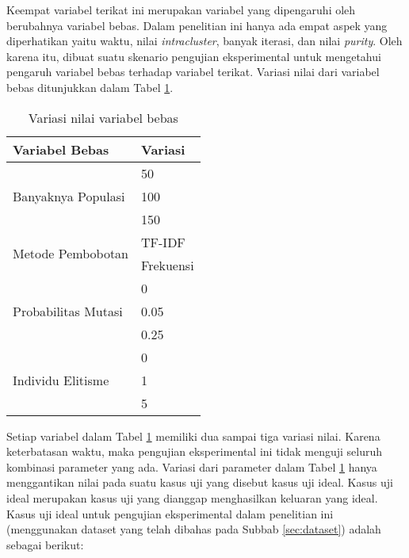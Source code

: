 Keempat variabel terikat ini merupakan variabel yang dipengaruhi oleh berubahnya variabel bebas. Dalam penelitian ini hanya ada empat aspek yang diperhatikan yaitu waktu, nilai \textit{intracluster}, banyak iterasi, dan nilai \textit{purity}. Oleh karena itu, dibuat suatu skenario pengujian eksperimental untuk mengetahui pengaruh variabel bebas terhadap variabel terikat. Variasi nilai dari variabel bebas ditunjukkan dalam Tabel \ref{tbl:testScenario}.

\begin{table}[H]
	\centering
	\caption{Variasi nilai variabel bebas}
	\begin{tabular}{|l|l|}
		\hline
		Variabel Bebas                       & Variasi   \\ \hline
		\multirow{3}{*}{Banyaknya Populasi}  & 50        \\ \cline{2-2} 
		                                     & 100       \\ \cline{2-2} 
		                                     & 150       \\ \hline
		\multirow{2}{*}{Metode Pembobotan}   & TF-IDF    \\ \cline{2-2} 
		                                     & Frekuensi \\ \hline
		\multirow{3}{*}{Probabilitas Mutasi} & 0         \\ \cline{2-2} 
		                                     & 0.05      \\ \cline{2-2} 
		                                     & 0.25      \\ \hline
		\multirow{3}{*}{Individu Elitisme}   & 0         \\ \cline{2-2} 
 		                                     & 1         \\ \cline{2-2} 
		                                     & 5         \\ \hline
\end{tabular}
	\label{tbl:testScenario}
\end{table}

Setiap variabel dalam Tabel \ref{tbl:testScenario} memiliki dua sampai tiga variasi nilai. Karena keterbatasan waktu, maka pengujian eksperimental ini tidak menguji seluruh kombinasi parameter yang ada. Variasi dari parameter dalam Tabel \ref{tbl:testScenario} hanya menggantikan nilai pada suatu kasus uji yang disebut kasus uji ideal. Kasus uji ideal merupakan kasus uji yang dianggap menghasilkan keluaran yang ideal. Kasus uji ideal untuk pengujian eksperimental dalam penelitian ini (menggunakan dataset yang telah dibahas pada Subbab \ref{sec:dataset}) adalah sebagai berikut:

